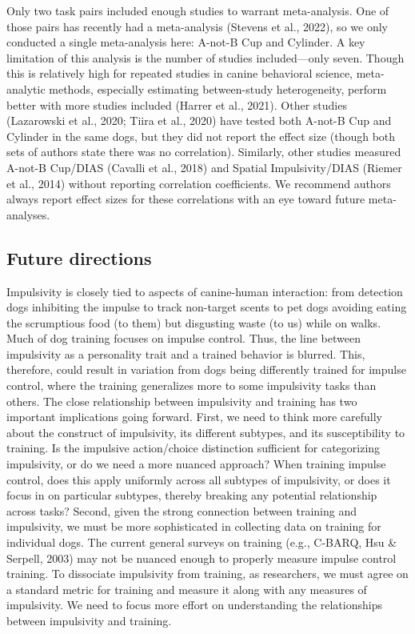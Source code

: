 \documentclass[
  ,pub,floatsintext]{apa6}
\begin{document}
Only two task pairs included enough studies to warrant meta-analysis. One of those pairs has recently had a meta-analysis (Stevens et al., 2022), so we only conducted a single meta-analysis here: A-not-B Cup and Cylinder. A key limitation of this analysis is the number of studies included---only seven. Though this is relatively high for repeated studies in canine behavioral science, meta-analytic methods, especially estimating between-study heterogeneity, perform better with more studies included (Harrer et al., 2021). Other studies (Lazarowski et al., 2020; Tiira et al., 2020) have tested both A-not-B Cup and Cylinder in the same dogs, but they did not report the effect size (though both sets of authors state there was no correlation). Similarly, other studies measured A-not-B Cup/DIAS (Cavalli et al., 2018) and Spatial Impulsivity/DIAS (Riemer et al., 2014) without reporting correlation coefficients. We recommend authors always report effect sizes for these correlations with an eye toward future meta-analyses.

\hypertarget{future-directions}{%
\subsection{Future directions}\label{future-directions}}

Impulsivity is closely tied to aspects of canine-human interaction: from detection dogs inhibiting the impulse to track non-target scents to pet dogs avoiding eating the scrumptious food (to them) but disgusting waste (to us) while on walks. Much of dog training focuses on impulse control. Thus, the line between impulsivity as a personality trait and a trained behavior is blurred. This, therefore, could result in variation from dogs being differently trained for impulse control, where the training generalizes more to some impulsivity tasks than others. The close relationship between impulsivity and training has two important implications going forward. First, we need to think more carefully about the construct of impulsivity, its different subtypes, and its susceptibility to training. Is the impulsive action/choice distinction sufficient for categorizing impulsivity, or do we need a more nuanced approach? When training impulse control, does this apply uniformly across all subtypes of impulsivity, or does it focus in on particular subtypes, thereby breaking any potential relationship across tasks? Second, given the strong connection between training and impulsivity, we must be more sophisticated in collecting data on training for individual dogs. The current general surveys on training (e.g., C-BARQ, Hsu \& Serpell, 2003) may not be nuanced enough to properly measure impulse control training. To dissociate impulsivity from training, as researchers, we must agree on a standard metric for training and measure it along with any measures of impulsivity. We need to focus more effort on understanding the relationships between impulsivity and training.
\end{document}

